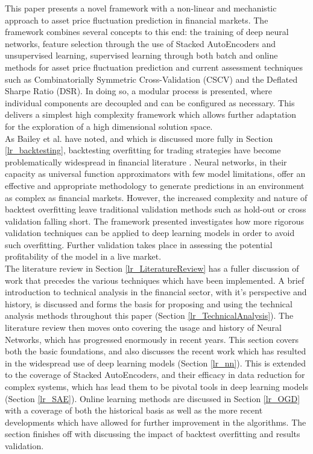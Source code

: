 \documentclass[a4paper,11pt,oneside]{article}
\theoremstyle{plain}
\theoremstyle{definition}
\begin{document}
	
	This paper presents a novel framework with a non-linear and mechanistic approach to asset price fluctuation prediction in financial markets. The framework combines several concepts to this end: the training of deep neural networks, feature selection through the use of Stacked AutoEncoders and unsupervised learning, supervised learning through both batch and online methods for asset price fluctuation prediction and current assessment techniques such as Combinatorially Symmetric Cross-Validation (CSCV) and the Deflated Sharpe Ratio (DSR). In doing so, a modular process is presented, where individual components are decoupled and can be configured as necessary. This delivers a simplest high complexity framework which allows further adaptation for the exploration of a high dimensional solution space. 
	~\\\newline
	As Bailey et al. have noted, and which is discussed more fully in Section \ref{lr_backtesting}, backtesting overfitting for trading strategies have become problematically widespread in financial literature \citep{BailyPBO}. Neural networks, in their capacity as universal function approximators with few model limitations, offer an effective and appropriate methodology to generate predictions in an environment as complex as financial markets. However, the increased complexity and nature of backtest overfitting leave traditional validation methods such as hold-out or cross validation falling short. The framework presented investigates how more rigorous validation techniques can be applied to deep learning models in order to avoid such overfitting. Further validation takes place in assessing the potential profitability of the model in a live market.
	~\\\newline
	The literature review in Section \ref{lr_LiteratureReview} has a fuller discussion of work that precedes the various techniques which have been implemented. A brief introduction to technical analysis in the financial sector, with it's perspective and history, is discussed and forms the basis for proposing and using the technical analysis methods throughout this paper (Section \ref{lr_TechnicalAnalysis}). The literature review then moves onto covering the usage and history of Neural Networks, which has progressed enormously in recent years. This section covers both the basic foundations, and also discusses the recent work which has resulted in the widespread use of deep learning models (Section \ref{lr_nn}). This is extended to the coverage of Stacked AutoEncoders, and their efficacy in data reduction for complex systems, which has lead them to be pivotal tools in deep learning models (Section \ref{lr_SAE}). Online learning methods are discussed in Section \ref{lr_OGD} with a coverage of both the historical basis as well as the more recent developments which have allowed for further improvement in the algorithms. The section finishes off with discussing the impact of backtest overfitting and results validation. 
\end{document}
